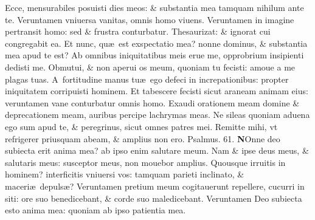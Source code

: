 \documentclass[a5paper,10pt]{book}
\def\ae{æ}
\begin{document}
\begin{multicols*}{2}
\newline \color{red} E\color{black}cce, mensurabiles posuisti dies meos: \& substantia mea tamquam nihilum ante te.
\newline \color{red} V\color{black}eruntamen vniuersa vanitas, omnis homo viuens.
\newline \color{red} V\color{black}eruntamen in imagine pertransit homo: sed \& frustra conturbatur.
\newline \color{red} T\color{black}hesaurizat: \& ignorat cui congregabit ea.
\newline \color{red} E\color{black}t nunc, qu\ae \ est exspectatio mea? nonne dominus, \& substantia mea apud te est?
\newline \color{red} A\color{black}b omnibus iniquitatibus meis erue me, opprobrium insipienti dedisti me.
\newline \color{red} O\color{black}bmutui, \& non aperui os meum, quoniam tu fecisti: amoue a me plagas tuas.
\newline \color{red} A\color{black}\ fortitudine manus tu\ae \ ego defeci in increpationibus: propter iniquitatem corripuisti hominem.
\newline \color{red} E\color{black}t tabescere fecisti sicut araneam animam eius: veruntamen vane conturbatur omnis homo.
\newline \color{red} E\color{black}xaudi orationem meam domine \& deprecationem meam, auribus percipe lachrymas meas.
\newline \color{red} N\color{black}e sileas quoniam aduena ego sum apud te, \& peregrinus, sicut omnes patres mei.
\newline \color{red} R\color{black}emitte mihi, vt refrigerer priusquam abeam, \& amplius non ero.
\newline \color{red} Psalmus. 61. \color{black}
\vspace{-.5em}
\lettrine[lines=2]{\bfseries \color{red} N}{}Onne deo subiecta erit anima mea? ab ipso enim salutare meum.
\newline \color{red} N\color{black}am \& ipse deus meus, \& salutaris meus: susceptor meus, non mouebor amplius.
\newline \color{red} Q\color{black}uousque irruitis in hominem? interficitis vniuersi vos: tamquam parieti inclinato, \& maceri\ae \ depuls\ae ?
\newline \color{red} V\color{black}eruntamen pretium meum cogitauerunt repellere, cucurri in siti: ore suo benedicebant, \& corde suo maledicebant.
\newline \color{red} V\color{black}eruntamen Deo subiecta esto anima mea: quoniam ab ipso patientia mea.

\end{multicols*}
\end{document}
